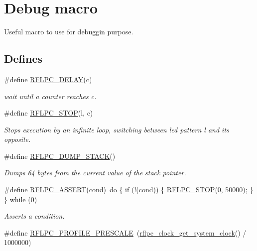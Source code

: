 \hypertarget{group__debug}{\section{Debug macro}
\label{group__debug}
}


Useful macro to use for debuggin purpose.  


\subsection*{Defines}
\begin{DoxyCompactItemize}
\item 
\#define \hyperlink{group__debug_ga2b98f7579cc73b6458ee0c28aa2a1cee}{R\-F\-L\-P\-C\-\_\-\-D\-E\-L\-A\-Y}(c)
\begin{DoxyCompactList}\small\item\em wait until a counter reaches c. \end{DoxyCompactList}\item 
\#define \hyperlink{group__debug_ga1e955c7aa5ce152f23a817e6bac16bcc}{R\-F\-L\-P\-C\-\_\-\-S\-T\-O\-P}(l, c)
\begin{DoxyCompactList}\small\item\em Stops execution by an infinite loop, switching between led pattern l and its opposite. \end{DoxyCompactList}\item 
\#define \hyperlink{group__debug_ga3ee7c50e6c59df3b77eaab8a6731cb64}{R\-F\-L\-P\-C\-\_\-\-D\-U\-M\-P\-\_\-\-S\-T\-A\-C\-K}()
\begin{DoxyCompactList}\small\item\em Dumps 64 bytes from the current value of the stack pointer. \end{DoxyCompactList}\item 
\#define \hyperlink{group__debug_ga7a517cb585da0af34947fe3d3f110bbd}{R\-F\-L\-P\-C\-\_\-\-A\-S\-S\-E\-R\-T}(cond)~do \{ if (!(cond)) \{ \hyperlink{group__debug_ga1e955c7aa5ce152f23a817e6bac16bcc}{R\-F\-L\-P\-C\-\_\-\-S\-T\-O\-P}(0, 50000); \} \} while (0)
\begin{DoxyCompactList}\small\item\em Asserts a condition. \end{DoxyCompactList}\item 
\#define \hyperlink{group__debug_gade638bd8e832b7cb23d79221bdd672b3}{R\-F\-L\-P\-C\-\_\-\-P\-R\-O\-F\-I\-L\-E\-\_\-\-P\-R\-E\-S\-C\-A\-L\-E}~(\hyperlink{group__clock_ga7e496bb7f41ac1ff5ab79f7bd1d8ef47}{rflpc\-\_\-clock\-\_\-get\-\_\-system\-\_\-clock}() / 1000000)

\end{DoxyCompactItemize}
